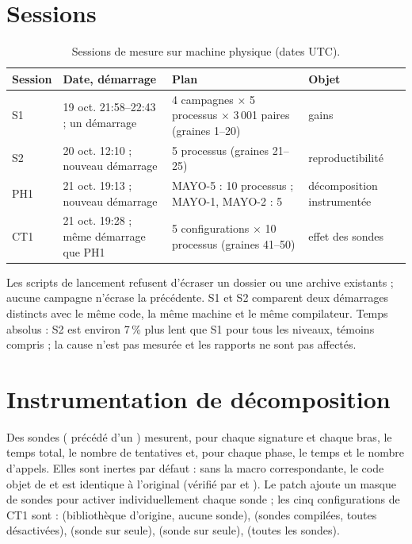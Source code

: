 \section{Sessions}
\begin{table}[ht]\centering\small
\caption{Sessions de mesure sur machine physique (dates UTC).}\label{tab:sessions}
\begin{tabularx}{\linewidth}{@{}lXXX@{}}\toprule
Session & Date, démarrage & Plan & Objet\\\midrule
S1 & 19 oct. 21:58--22:43 ; un démarrage & 4 campagnes $\times$ 5 processus $\times$ 3\,001 paires (graines 1--20) & gains\\
S2 & 20 oct. 12:10 ; nouveau démarrage & 5 processus (graines 21--25) & reproductibilité\\
PH1 & 21 oct. 19:13 ; nouveau démarrage & MAYO-5 : 10 processus ; MAYO-1, MAYO-2 : 5 & décomposition instrumentée\\
CT1 & 21 oct. 19:28 ; même démarrage que PH1 & 5 configurations $\times$ 10 processus (graines 41--50) & effet des sondes\\\bottomrule
\end{tabularx}
\end{table}
Les scripts de lancement refusent d'écraser un dossier ou une archive existants ; aucune campagne n'écrase la précédente. S1 et S2 comparent deux démarrages distincts avec le même code, la même machine et le même compilateur. Temps absolus : S2 est environ 7\,\% plus lent que S1 pour tous les niveaux, témoins compris ; la cause n'est pas mesurée et les rapports ne sont pas affectés.

\section{Instrumentation de décomposition}
Des sondes ( précédé d'un ) mesurent, pour chaque signature et chaque bras, le temps total, le nombre de tentatives et, pour chaque phase, le temps et le nombre d'appels. Elles sont inertes par défaut : sans la macro correspondante, le code objet de  et  est identique à l'original (vérifié par  et ). Le patch  ajoute un masque de sondes pour activer individuellement chaque sonde ; les cinq configurations de CT1 sont :  (bibliothèque d'origine, aucune sonde),  (sondes compilées, toutes désactivées),  (sonde sur  seule),  (sonde sur  seule),  (toutes les sondes).

